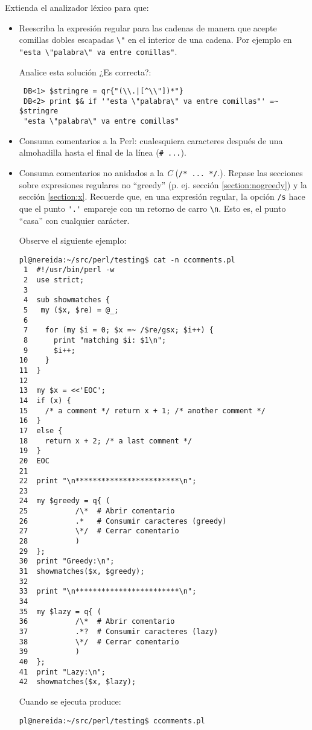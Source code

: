 \label{practica:lineasyerrores}
Extienda el analizador léxico para que:
\begin{itemize}
\item
Reescriba la expresión regular para las cadenas de manera que acepte comillas dobles 
escapadas \verb|\"| en el interior de una cadena.
Por ejemplo en \verb|"esta \"palabra\" va entre comillas"|.

Analice esta solución ¿Es correcta?:
\begin{verbatim}
 DB<1> $stringre = qr{"(\\.|[^\\"])*"}
 DB<2> print $& if '"esta \"palabra\" va entre comillas"' =~ $stringre
 "esta \"palabra\" va entre comillas"
\end{verbatim}

\item Consuma comentarios a la Perl: 
cualesquiera caracteres después de una almohadilla hasta el final 
de la línea (\verb|# ...|).
\item
Consuma comentarios no anidados a la \emph{C} (\verb|/* ... */|.).
Repase las secciones sobre expresiones regulares no ``greedy'' (p. ej. sección
\ref{section:nogreedy}) y la sección \ref{section:x}.
Recuerde que, en una expresión regular, 
la opción \verb|/s| hace que el punto \verb|'.'| empareje con un 
retorno de carro \verb|\n|.  Esto es, el punto ``casa'' con cualquier carácter.

Observe el siguiente ejemplo:
\begin{verbatim}
pl@nereida:~/src/perl/testing$ cat -n ccomments.pl
 1  #!/usr/bin/perl -w
 2  use strict;
 3
 4  sub showmatches {
 5   my ($x, $re) = @_;
 6
 7    for (my $i = 0; $x =~ /$re/gsx; $i++) {
 8      print "matching $i: $1\n";
 9      $i++;
10    }
11  }
12
13  my $x = <<'EOC';
14  if (x) {
15    /* a comment */ return x + 1; /* another comment */
16  }
17  else {
18    return x + 2; /* a last comment */
19  }
20  EOC
21
22  print "\n************************\n";
23
24  my $greedy = q{ (
25           /\*  # Abrir comentario
26           .*   # Consumir caracteres (greedy)
27           \*/  # Cerrar comentario
28           )
29  };
30  print "Greedy:\n";
31  showmatches($x, $greedy);
32
33  print "\n************************\n";
34
35  my $lazy = q{ (
36           /\*  # Abrir comentario
37           .*?  # Consumir caracteres (lazy)
38           \*/  # Cerrar comentario
39           )
40  };
41  print "Lazy:\n";
42  showmatches($x, $lazy);
\end{verbatim}
Cuando se ejecuta produce:
\begin{verbatim}
pl@nereida:~/src/perl/testing$ ccomments.pl


\end{verbatim}
\end{itemize}
